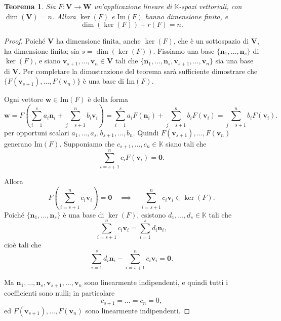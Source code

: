 \documentclass{article}
\theoremstyle{plain}
\newtheorem{thm}{Teorema}[section]
\theoremstyle{definition}
\theoremstyle{remark}
\begin{document}
\begin{bxthm}\label{undicisei}
\begin{thm}
Sia \( F\colon \mathbf{V} \to \mathbf{W} \) un'applicazione lineare di \( \mathbb{K} \)-spazi vettoriali, con \( \dim(\mathbf{V}) = n \). 
Allora \( \ker(F) \) e \( \mathrm{Im}(F) \) hanno dimensione finita, e
\[\dim(\ker(F)) + r(F) = n.\]    
\end{thm}
\end{bxthm}
\begin{proof}
Poiché \( \mathbf{V} \) ha dimensione finita, anche \( \ker(F) \), che è un sottospazio di \( \mathbf{V} \), ha dimensione finita; sia \( s = \dim(\ker(F)) \). 
Fissiamo una base \( \{\mathbf{n}_1, \ldots, \mathbf{n}_s\} \) di \( \ker(F) \), e siano \( \mathbf{v}_{s+1}, \ldots, \mathbf{v}_n \in\mathbf{V}\) tali che \( \{\mathbf{n}_1, \ldots, \mathbf{n}_s, \mathbf{v}_{s+1}, \ldots, \mathbf{v}_n\} \) sia una base di \( \mathbf{V} \). 
Per completare la dimostrazione del teorema sarà sufficiente dimostrare che \( \{F(\mathbf{v}_{s+1}), \ldots, F(\mathbf{v}_n)\} \) è una base di \( \mathrm{Im}(F) \).

Ogni vettore \( \mathbf{w} \in \mathrm{Im}(F) \) è della forma
\[\mathbf{w}=F\left(\sum_{i=1}^{s}a_i\mathbf{n}_i+\sum_{j=s+1}^{n}b_i\mathbf{v}_i\right)=\sum_{i=1}^{s}a_iF(\mathbf{n}_i)+\sum_{j=s+1}^{n}b_iF(\mathbf{v}_i)=\sum_{j=s+1}^{n}b_iF(\mathbf{v}_i).\]
per opportuni scalari \( a_1, \ldots, a_s, b_{s+1}, \ldots, b_n \). Quindi \( F(\mathbf{v}_{s+1}), \ldots, F(\mathbf{v}_n) \) generano \( \mathrm{Im}(F) \).
Supponiamo che \( c_{s+1}, \ldots, c_n \in \mathbb{K} \) siano tali che
\[\sum_{i=s+1}^{n}c_{i} F(\mathbf{v}_{i}) = \mathbf{0}.\]

Allora
\[F\left(\sum_{i=s+1}^{n}c_{i} \mathbf{v}_{i}\right)=\mathbf{0} \quad\implies\quad \sum_{i=s+1}^{n}c_{i} \mathbf{v}_{i} \in \ker(F).\]
Poiché \( \{\mathbf{n}_1, \ldots, \mathbf{n}_s\} \) è una base di \( \ker(F) \), esistono \( d_1, \ldots, d_s \in \mathbb{K} \) tali che
\[\sum_{i=s+1}^{n}c_{i} \mathbf{v}_{i}=\sum_{i=1}^{s}d_i\mathbf{n}_i,\]
cioè tali che
\[\sum_{i=1}^{s}d_i\mathbf{n}_i - \sum_{i=s+1}^{n}c_{i} \mathbf{v}_{i} = \mathbf{0}.\]

Ma \( \mathbf{n}_1, \ldots, \mathbf{n}_s, \mathbf{v}_{s+1}, \ldots, \mathbf{v}_n \) sono linearmente indipendenti, e quindi tutti i coefficienti sono nulli; in particolare
\[c_{s+1} = \ldots = c_n = 0,\]
ed \( F(\mathbf{v}_{s+1}), \ldots, F(\mathbf{v}_n) \) sono linearmente indipendenti.
\end{proof}
\end{document}
